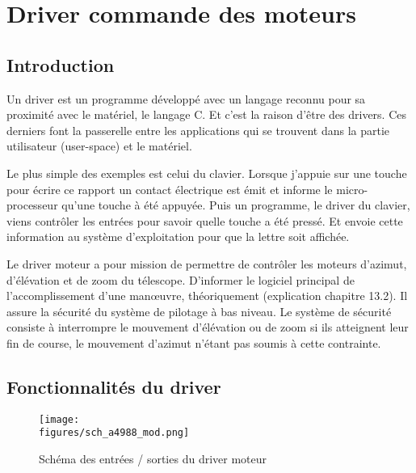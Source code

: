 \chapter{Driver commande des moteurs}

\section{Introduction}

Un driver est un programme développé avec un langage reconnu pour sa proximité avec le matériel, le langage C. Et c'est la raison d'être des drivers. Ces derniers font la passerelle entre les applications qui se trouvent dans la partie utilisateur (user-space) et le matériel.

\vspace{1cm}

Le plus simple des exemples est celui du clavier. Lorsque j'appuie sur une touche pour écrire ce rapport un contact électrique est émit et informe le micro-processeur qu'une touche à été appuyée. Puis un programme, le driver du clavier, viens contrôler les entrées pour savoir quelle touche a été pressé. Et envoie cette information au système d'exploitation pour que la lettre soit affichée.

\vspace{1cm}

Le driver moteur a pour mission de permettre de contrôler les moteurs d'azimut, d'élévation et de zoom du télescope. D'informer le logiciel principal de l'accomplissement d'une manœuvre, théoriquement (explication chapitre 13.2). Il assure la sécurité du système de pilotage à bas niveau. Le système de sécurité consiste à interrompre le mouvement d'élévation ou de zoom si ils atteignent leur fin de course, le mouvement d'azimut n'étant pas soumis à cette contrainte.

\section{Fonctionnalités du driver}

\begin{figure}[H]
    \centering
    \texttt{[image: \\figures/sch\_a4988\_mod.png]}
    \decoRule
    \caption[
    Schéma des entrées / sorties du driver moteur]{
    Schéma des entrées / sorties du driver moteur}
    \label{fig:Schéma des entrées / sorties du driver moteur}
    \end{figure}

\vspace{1cm}

